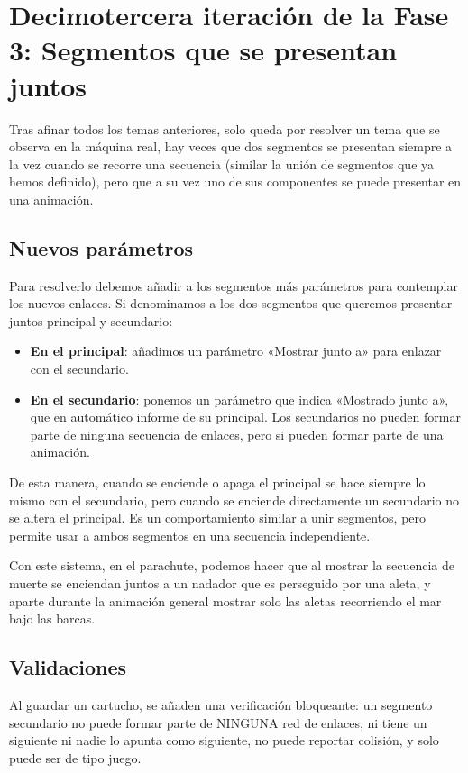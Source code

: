 \section{Decimotercera iteración de la Fase 3: Segmentos que se presentan juntos}
\label{sec:SegmentosPresentanJuntos}

Tras afinar todos los temas anteriores, solo queda por resolver un tema que se observa en la máquina real, hay veces que dos segmentos se presentan siempre a la vez cuando se recorre una secuencia (similar la unión de segmentos que ya hemos definido), pero que a su vez uno de sus componentes se puede presentar en una animación.

\subsection{Nuevos parámetros}
Para resolverlo debemos añadir a los segmentos más parámetros para contemplar los nuevos enlaces. Si denominamos a los dos segmentos que queremos presentar juntos principal y 
secundario:
\begin{itemize}
	\item \textbf{En el principal}: añadimos un parámetro «Mostrar junto a» para enlazar con el secundario.
	\item \textbf{En el secundario}: ponemos un parámetro que indica «Mostrado junto a», que en automático informe de su principal. Los secundarios no pueden formar parte de ninguna secuencia de enlaces, pero si pueden formar parte de una animación.
\end{itemize}

De esta manera, cuando se enciende o apaga el principal se hace siempre lo mismo con el secundario, pero cuando se enciende directamente un secundario no se altera el principal. Es un comportamiento similar a unir segmentos, pero permite usar a ambos segmentos en una secuencia independiente.

Con este sistema, en el parachute, podemos hacer que al mostrar la secuencia de muerte se enciendan juntos a un nadador que es perseguido por una aleta, y aparte durante la animación general mostrar solo las aletas recorriendo el mar bajo las barcas.

\subsection{Validaciones}
Al guardar un cartucho, se añaden una verificación bloqueante: un segmento secundario no puede formar parte de NINGUNA red de enlaces, ni tiene un siguiente ni nadie lo apunta como siguiente, no puede reportar colisión, y solo puede ser de tipo juego.

